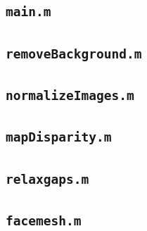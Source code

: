 \documentclass[journal]{IEEEtran}
\begin{document}
%
\subsection{\texttt{main.m}}
\label{sec:main}


\subsection{\texttt{removeBackground.m}}
\label{sec:removeBackground}


\subsection{\texttt{normalizeImages.m}}
\label{sec:normalizeImages}


\subsection{\texttt{mapDisparity.m}}
\label{sec:mapDisparity}


\subsection{\texttt{relaxgaps.m}}
\label{sec:relaxgaps}


\subsection{\texttt{facemesh.m}}
\label{sec:facemesh}



\ifCLASSOPTIONcaptionsoff
  \newpage
\fi




\end{document}

